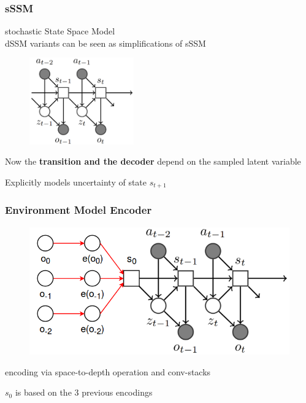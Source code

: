 \begin{frame}
	\frametitle{sSSM}
	\vspace{-10mm}
	stochastic State Space Model\\
	dSSM variants can be seen as simplifications of sSSM \\
	\begin{multicols}{2}
		\begin{figure}[h]
			\includegraphics[width=0.4\textwidth]{./latent_i2a_images/sSSM2.png}	
		\end{figure}
		\columnbreak
		\begin{PraesentationAufzaehlung}
			\item Now the \textbf{transition and the decoder} depend on the sampled latent variable
			\item Explicitly models uncertainty of state $s_{t+1}$
		\end{PraesentationAufzaehlung}
	\end{multicols}
\end{frame}


\begin{frame}
	\frametitle{Environment Model Encoder}
	\begin{figure}[h]
		\includegraphics[width=0.8\textheight]{./latent_i2a_images/Encoder.png}	
	\end{figure}
	\begin{PraesentationAufzaehlung}
		\item encoding via space-to-depth operation and conv-stacks
		\item $s_0$ is based on the 3 previous encodings
	\end{PraesentationAufzaehlung}
\end{frame}


